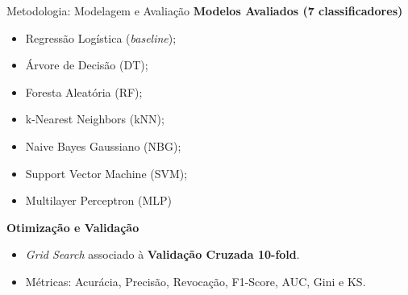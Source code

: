 \documentclass[aspectratio=169]{beamer}
\begin{document}
\begin{frame}{Metodologia: Modelagem e Avaliação}
    \textbf{Modelos Avaliados (7 classificadores)}
    \begin{itemize}
        \item Regressão Logística (\textit{baseline});
        \item Árvore de Decisão (DT);
        \item Foresta Aleatória (RF);
        \item k-Nearest Neighbors (kNN);
        \item Naive Bayes Gaussiano (NBG);
        \item Support Vector Machine (SVM);
        \item Multilayer Perceptron (MLP)
    \end{itemize}
    \vspace{0.3cm}
    
    \textbf{Otimização e Validação}
    \begin{itemize}
        \item \textit{Grid Search} associado à \textbf{Validação Cruzada 10-fold}.
        \item Métricas: Acurácia, Precisão, Revocação, F1-Score, AUC, Gini e KS.
    \end{itemize}
\end{frame}
\end{document}
